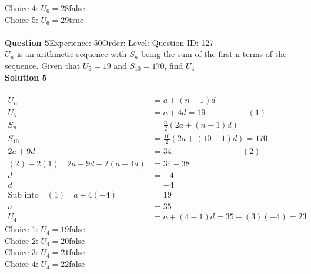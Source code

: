 \documentclass{article}
\begin{document}
Choice 4: \hspace{20pt}$U_{6}=28$\hspace{20pt}false\\
Choice 5: \hspace{20pt}$U_{6}=29$\hspace{20pt}true\\
\\[4pt]
\noindent\textbf{Question 5}\hspace{20pt}Experience: 50\hspace{20pt}Order: \hspace{20pt}Level: \hspace{20pt}Question-ID: 127\\[2pt]
$U_n$ is an arithmetic sequence with $S_n$ being the sum of the first n terms of the sequence. Given that $U_{5}=19$ and $S_{10}=170$, find $U_{4}$\\[4pt]
\noindent\textbf{Solution 5}\\[2pt]
\\[-35pt]\begin{align*}
U_n&=a+(n-1)d\\[2pt]
U_5&=a+4d=19 \hspace{62pt} (1)\\[2pt]
S_n&=\displaystyle\frac{n}{2}(2a+(n-1)d)\\[2pt]
S_{10}&=\displaystyle\frac{10}{2}(2a+(10-1)d)=170\\[2pt]
2a+9d&=34\hspace{103pt} (2)\\[2pt]
(2)-2(1) \quad 2a+9d-2(a+4d)&=34-38\\[2pt]
d&=-4\\[2pt]
d&=-4\\[2pt]
\text{Sub into}\quad (1) \quad a+4(-4)&=19\\[2pt]
a&=35\\[12pt]
U_4&=a+(4-1)d=35+(3)(-4)=23
\end{align*}
Choice 1: \hspace{20pt}$U_{4}=19$\hspace{20pt}false\\
Choice 2: \hspace{20pt}$U_{4}=20$\hspace{20pt}false\\
Choice 3: \hspace{20pt}$U_{4}=21$\hspace{20pt}false\\
Choice 4: \hspace{20pt}$U_{4}=22$\hspace{20pt}false\\
\end{document}
